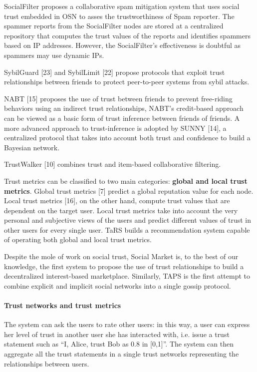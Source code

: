 SocialFilter \cite{yang_socialfilter:_2009} proposes a collaborative spam mitigation system that uses social trust embedded in OSN to asses the trustworthiness of Spam reporter.
The spammer reports from the SocialFilter nodes are stored at a centralized repository that computes the trust values of the reports and identifies spammers based on IP addresses.
However,
	the SocialFilter’s effectiveness is doubtful as spammers may use dynamic IPs.


SybilGuard [23] and SybilLimit [22] propose protocols that exploit trust relationships between friends to protect peer-to-peer systems from sybil attacks.

NABT [15] proposes the use of trust between friends to prevent free-riding behaviors using an indirect trust relationships,
	NABT’s credit-based approach can be viewed as a basic form of trust inference between friends of friends.
A more advanced approach to trust-inference is adopted by SUNNY [14],
	a centralized protocol that takes into account both trust and confidence to build a Bayesian network.

TrustWalker [10] combines trust and item-based collaborative filtering.

Trust metrics can be classified to two main categories: \textbf{global and local trust metrics}.
Global trust metrics [7] predict a global reputation value for each node. %
Local trust metrics [16],
	on the other hand,
	compute trust values that are dependent on the target user.
Local trust metrics take into account the very personal and subjective views of the users and predict different values of trust in other users for every single user.
TaRS \cite{massa_trust-aware_2007} builds a recommendation system capable of operating both global and local trust metrics.

Despite the mole of work on social trust,
	Social Market is,
	to the best of our knowledge,
	the first system to propose the use of trust relationships to build a decentralized interest-based marketplace.
Similarly,
	TAPS is the first attempt to combine explicit and implicit social networks into a single gossip protocol.

\paragraph{Trust networks and trust metrics}
The system can ask the users to rate other users: in this way,
	a user can express her level of trust in another user she has interacted with,
	i.e. issue a trust statement such as “I, Alice, trust Bob as 0.8 in [0,1]”.
The system can then aggregate all the trust statements in a single trust networks representing the relationships between users.

